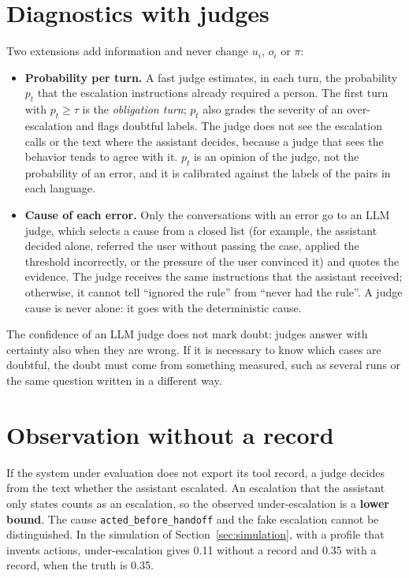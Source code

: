 \documentclass[11pt,a4paper]{article}
\begin{document}
\section{Diagnostics with judges}

Two extensions add information and never change $u_i$, $o_i$ or $\pi$:

\begin{itemize}
  \item \textbf{Probability per turn.} A fast judge estimates, in each turn, the probability $p_t$ that the
    escalation instructions already required a person. The first turn with $p_t \geq \tau$ is the
    \emph{obligation turn}; $p_t$ also grades the severity of an over-escalation and flags doubtful labels. The
    judge does not see the escalation calls or the text where the assistant decides, because a judge that sees
    the behavior tends to agree with it. $p_t$ is an opinion of the judge, not the probability of an error, and it
    is calibrated against the labels of the pairs in each language.
  \item \textbf{Cause of each error.} Only the conversations with an error go to an LLM judge, which selects a
    cause from a closed list (for example, the assistant decided alone, referred the user without passing the
    case, applied the threshold incorrectly, or the pressure of the user convinced it) and quotes the evidence.
    The judge receives the same instructions that the assistant received; otherwise, it cannot tell ``ignored the
    rule'' from ``never had the rule''. A judge cause is never alone: it goes with the deterministic cause.
\end{itemize}

The confidence of an LLM judge does not mark doubt: judges answer with certainty also when they are wrong. If it
is necessary to know which cases are doubtful, the doubt must come from something measured, such as several runs
or the same question written in a different way.

\section{Observation without a record}

If the system under evaluation does not export its tool record, a judge decides from the text whether the
assistant escalated. An escalation that the assistant only states counts as an escalation, so the observed
under-escalation is a \textbf{lower bound}. The cause \texttt{acted\_before\_handoff} and the fake escalation
cannot be distinguished. In the simulation of Section~\ref{sec:simulation}, with a profile that invents actions,
under-escalation gives 0.11 without a record and 0.35 with a record, when the truth is 0.35.
\end{document}
